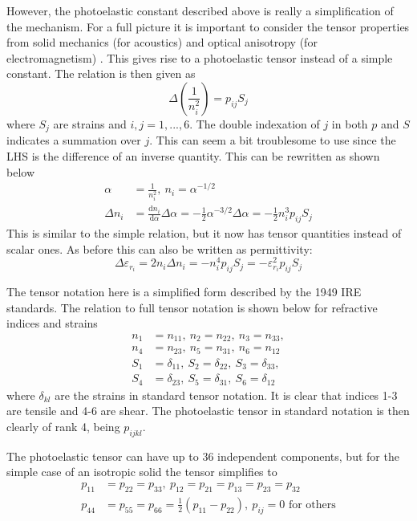 \documentclass[10pt,a4paper,draft]{scrartcl}
\begin{document}
	However, the photoelastic constant described above is really a simplification of the mechanism. For a full picture it is important to consider the tensor properties from solid mechanics (for acoustics) and optical anisotropy (for electromagnetism) \cite{Korpel1988}. This gives rise to a photoelastic tensor instead of a simple constant. The relation is then given as \cite{Korpel1988}
	\begin{equation*}
	\Delta \left( \frac{1}{n_i^2} \right) = p_{ij} S_j
	\end{equation*}
	where $S_j$ are strains and $i,j = 1,...,6$. The double indexation of $j$ in both $p$ and $S$ indicates a summation over $j$. This can seem a bit troublesome to use since the LHS is the difference of an inverse quantity. This can be rewritten as shown below
	\begin{align*}
	\alpha &= \frac{1}{n_i^2},\ n_i = \alpha^{-1/2} \\
	\Delta n_i &= \frac{\mathrm{d}n_i}{\mathrm{d}\alpha} \Delta \alpha = -\frac{1}{2} \alpha^{-3/2} \Delta \alpha = -\frac{1}{2} n_i^3 p_{ij} S_j
	\end{align*}
	This is similar to the simple relation, but it now has tensor quantities instead of scalar ones. As before this can also be written as permittivity:
	\begin{equation*}
	\Delta \varepsilon_{r_i} = 2n_i\Delta n_i = -n_i^4 p_{ij} S_j = -\varepsilon_{r_i}^2 p_{ij} S_j
	\end{equation*}
	
	The tensor notation here is a simplified form described by the 1949 IRE standards. The relation to full tensor notation is shown below for refractive indices and strains \cite{Korpel1988}
	\begin{align*}
	n_1 &= n_{11},\ n_2 = n_{22},\ n_3 = n_{33}, \\
	n_4 &= n_{23},\ n_5 = n_{31},\ n_6 = n_{12} \\
	S_1 &= \delta_{11},\ S_2 = \delta_{22},\ S_3 = \delta_{33}, \\
	S_4 &= \delta_{23},\ S_5 = \delta_{31},\ S_6 = \delta_{12}
	\end{align*}
	where $\delta_{kl}$ are the strains in standard tensor notation. It is clear that indices 1-3 are tensile and 4-6 are shear. The photoelastic tensor in standard notation is then clearly of rank 4, being $p_{ijkl}$.
	
	The photoelastic tensor can have up to 36 independent components, but for the simple case of an isotropic solid the tensor simplifies to \cite{Korpel1988}
	\begin{align*}
	p_{11} &= p_{22} = p_{33}, \ p_{12} = p_{21} = p_{13} = p_{23} = p_{32}\\
	p_{44} &= p_{55} = p_{66} = \frac{1}{2} (p_{11} - p_{22}), \ p_{ij} = 0 \text{ for others}
	\end{align*}
	
\end{document}
